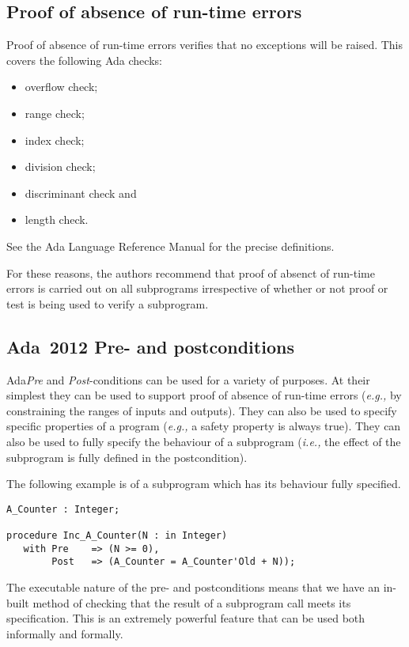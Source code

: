 \documentclass{llncs}
\newcommand{\ada}{Ada\xspace}
\newcommand{\adatwtw}{Ada~2012\xspace}
\newcommand{\ie}{\textit{i.e.,}\xspace}
\newcommand{\eg}{\textit{e.g.,}\xspace}
\begin{document}
\subsection{Proof of absence of run-time errors}

Proof of absence of run-time errors verifies that no exceptions will be raised. This covers the following Ada checks:

\begin{itemize}
   \item overflow check;
   \item range check;
   \item index check;
   \item division check;
   \item discriminant check and
   \item length check.
\end{itemize}

See the Ada Language Reference Manual for the precise definitions.

For these reasons, the authors recommend that proof of absenct of run-time errors is carried out on all subprograms irrespective of whether or not proof or test is being used to verify a subprogram.

\subsection{\adatwtw Pre- and postconditions}

\ada \emph{Pre} and \emph{Post}-conditions can be used for a variety of purposes. At their simplest they can be used to support proof of absence of run-time errors (\eg by constraining the ranges of inputs and outputs). They can also be used to specify specific properties of a program (\eg a safety property is always true). They can also be used to fully specify the behaviour of a subprogram (\ie the effect of the subprogram is fully defined in the postcondition).

The following example is of a subprogram which has its behaviour fully specified.

\begin{lstlisting}
A_Counter : Integer;

procedure Inc_A_Counter(N : in Integer)
   with Pre    => (N >= 0),
        Post   => (A_Counter = A_Counter'Old + N));

\end{lstlisting}

The executable nature of the pre- and postconditions means that we have an in-built method of checking that the result of a subprogram call meets its specification. This is an extremely powerful feature that can be used both informally and formally. 
\end{document}
